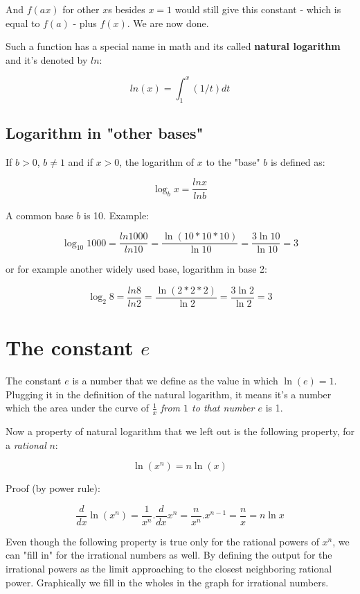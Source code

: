 \documentclass{article}
\begin{document}
	And $f(ax)$ for other $x$s besides $x = 1$ would still give this constant - which is equal to $f(a)$ - plus $f(x)$. We are now done.
	
	Such a function has a special name in math and its called \textbf{natural logarithm} and it's denoted by $ln$:
	
	\begin{equation}
	ln(x) = \int_{1}^{x} (1/t) dt
	\end{equation}

	\subsection{Logarithm in "other bases"}
	
	If $b > 0$, $b \neq 1$ and if $x > 0$, the logarithm of $x$ to the "base" $b$ is defined as:
	
	$$ \log_b x = \frac{ln x}{ln b} $$
	
	A common base $b$ is 10. Example:
	
	$$ \log_{10} 1000 = \frac{ln 1000}{ln 10} = \frac{\ln (10 * 10 * 10)}{ \ln 10} = \frac{3 \ln 10}{\ln 10} = 3 $$
	
	or for example another widely used base, logarithm in base 2:
	
	$$ \log_{2} 8 = \frac{ln 8}{ln 2} = \frac{\ln (2 * 2 * 2)}{ \ln 2} = \frac{3 \ln 2}{\ln 2} = 3 $$
	
	\section{The constant $e$}
	The constant $e$ is a number that we define as the value in which $\ln(e) = 1$. Plugging it in the definition of the natural logarithm, it means it's a number which the area under the curve of $\frac{1}{x}$ \textit{from $1$ to that number $e$} is 1.
	

	Now a property of natural logarithm that we left out is the following property, for a \textit{rational} $n$:
	
	$$ \ln(x^n) = n\ln(x) $$ 
	
	Proof (by power rule):
	
	$$ \frac{d}{dx} \ln(x^n) = \frac{1}{x^n} . \frac{d}{dx} x^n = \frac{n}{x^n} . x^{n-1} = \frac{n}{x} = n \ln x$$
	
	Even though the following property is true only for the rational powers of $x^n$, we can "fill in" for the irrational numbers as well. By defining the output for the irrational powers as the limit approaching to the closest neighboring rational power. Graphically we fill in the wholes in the graph for irrational numbers.
	
\end{document}
